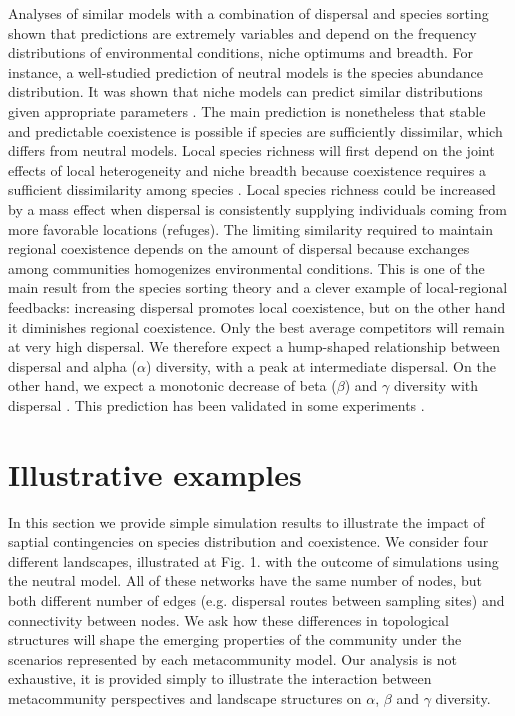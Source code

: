 \documentclass[12pt]{article}
\begin{document}
Analyses of similar models with a combination of dispersal and species sorting
shown that predictions are extremely variables and depend on the frequency
distributions of environmental conditions, niche optimums and breadth. For
instance, a well-studied prediction of neutral models is the species abundance
distribution. It was shown that niche models can predict similar distributions
given appropriate parameters \parencite{Tilman2004,Gravel2006}. The main
prediction is nonetheless that stable and predictable coexistence is possible if
species are sufficiently dissimilar, which differs from neutral models. Local
species richness will first depend on the joint effects of local heterogeneity
and niche breadth because coexistence requires a sufficient dissimilarity among
species \parencite{Schwilk2005}. Local species richness could be increased by a
mass effect when dispersal is consistently supplying individuals coming from
more favorable locations (refuges). The limiting similarity required to maintain
regional coexistence depends on the amount of dispersal because exchanges among
communities homogenizes environmental conditions. This is one of the main result
from the species sorting theory and a clever example of local-regional
feedbacks: increasing dispersal promotes local coexistence, but on the other
hand it diminishes regional coexistence. Only the best average competitors will
remain at very high dispersal. We therefore expect
a hump-shaped relationship between dispersal and alpha ($\alpha$) diversity,
with a peak at intermediate dispersal. On the other hand, we expect a monotonic
decrease of beta ($\beta$) and $\gamma$ diversity with dispersal
\parencite{Mouquet2003}. This prediction has been validated in some experiments
\parencite{Venail2008, Logue2011}.

\section*{Illustrative examples}

In this section we provide simple simulation results to illustrate the impact of
saptial contingencies on species distribution and coexistence. We consider four
different landscapes, illustrated at Fig. 1. with the outcome of simulations
using the neutral model. All of these networks have the same number of nodes,
but both different number of edges (e.g. dispersal routes between sampling
sites) and connectivity between nodes. We ask how these differences
in topological structures will shape the emerging properties of the community under the
scenarios represented by each metacommunity model. Our analysis is not
exhaustive, it is provided simply to illustrate the interaction between
metacommunity perspectives and landscape structures on $\alpha$, $\beta$ and
$\gamma$ diversity.
\end{document}
